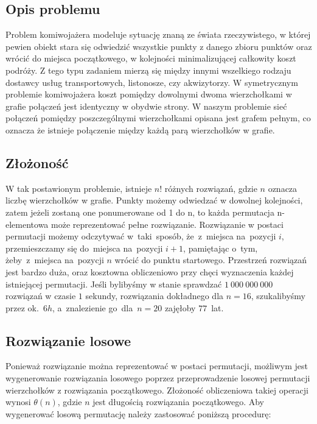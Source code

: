\subsection{Opis problemu}

Problem komiwojażera modeluje sytuację znaną ze świata rzeczywistego, w której pewien obiekt stara się odwiedzić wszystkie punkty z danego zbioru punktów oraz wrócić do miejsca początkowego, w kolejności minimalizującej całkowity koszt podróży. Z tego typu zadaniem mierzą się między innymi wszelkiego rodzaju dostawcy usług transportowych, listonosze, czy akwizytorzy. W symetrycznym problemie komiwojażera koszt pomiędzy dowolnymi dwoma wierzchołkami w grafie połączeń jest identyczny w obydwie strony. W naszym problemie sieć połączeń pomiędzy poszczególnymi wierzchołkami opisana jest grafem pełnym, co oznacza że istnieje połączenie między każdą parą wierzchołków w grafie.

\subsection{Złożoność}

W tak postawionym problemie, istnieje $n!$  różnych rozwiązań, gdzie $n$ oznacza liczbę wierzchołków w grafie. Punkty możemy odwiedzać w dowolnej kolejności, zatem jeżeli zostaną one ponumerowane od 1 do n, to każda permutacja n-elementowa może reprezentować pełne rozwiązanie. Rozwiązanie w postaci permutacji możemy odczytywać w~taki~sposób, że~z~miejsca na~pozycji $i$, przemieszczamy się do~miejsca na~pozycji $i+1$, pamiętając o~tym, żeby~z~miejsca na~pozycji $n$ wrócić do punktu startowego. Przestrzeń rozwiązań jest bardzo duża, oraz kosztowna obliczeniowo przy chęci wyznaczenia każdej istniejącej permutacji. Jeśli bylibyśmy w stanie sprawdzać $1\ 000\ 000\ 000$ rozwiązań w czasie $1$ sekundy, rozwiązania dokładnego dla $n=16$, szukalibyśmy przez ok.~$6h$, a~znalezienie go~dla~$n=20$ zajęłoby $77$~lat.

\subsection{Rozwiązanie losowe}

Ponieważ rozwiązanie można reprezentować w postaci permutacji, możliwym jest wygenerowanie rozwiązania losowego poprzez przeprowadzenie losowej permutacji wierzchołków z rozwiązania początkowego. Złożoność obliczeniowa takiej operacji wynosi $\theta(n)$, gdzie $n$ jest długością rozwiązania początkowego. Aby wygenerować losową permutację należy zastosować poniższą procedurę:

